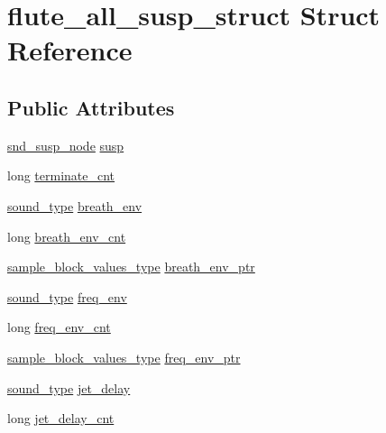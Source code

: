 \hypertarget{structflute__all__susp__struct}{}\section{flute\+\_\+all\+\_\+susp\+\_\+struct Struct Reference}
\label{structflute__all__susp__struct}
\subsection*{Public Attributes}
\begin{DoxyCompactItemize}
\item 
\hyperlink{sound_8h_a6b268203688a934bd798ceb55f85d4c0}{snd\+\_\+susp\+\_\+node} \hyperlink{structflute__all__susp__struct_afa541f45e24cb362f093246e91f13b1d}{susp}
\item 
long \hyperlink{structflute__all__susp__struct_a932b82614ea602dce0e45ea35ebba5e0}{terminate\+\_\+cnt}
\item 
\hyperlink{sound_8h_a792cec4ed9d6d636d342d9365ba265ea}{sound\+\_\+type} \hyperlink{structflute__all__susp__struct_afbe08c1b6541f6482034401882dbc6ee}{breath\+\_\+env}
\item 
long \hyperlink{structflute__all__susp__struct_a622286a136889a45a3f188decf524bf7}{breath\+\_\+env\+\_\+cnt}
\item 
\hyperlink{sound_8h_a83d17f7b465d1591f27cd28fc5eb8a03}{sample\+\_\+block\+\_\+values\+\_\+type} \hyperlink{structflute__all__susp__struct_ac46ce28b8ff7f1011bd99d666cf8fa37}{breath\+\_\+env\+\_\+ptr}
\item 
\hyperlink{sound_8h_a792cec4ed9d6d636d342d9365ba265ea}{sound\+\_\+type} \hyperlink{structflute__all__susp__struct_ad66dd4b1e5248a4feb91cfff31000f1b}{freq\+\_\+env}
\item 
long \hyperlink{structflute__all__susp__struct_aff71c1c9cf7f443da6bb3c6ee17ce0c4}{freq\+\_\+env\+\_\+cnt}
\item 
\hyperlink{sound_8h_a83d17f7b465d1591f27cd28fc5eb8a03}{sample\+\_\+block\+\_\+values\+\_\+type} \hyperlink{structflute__all__susp__struct_ac46e87153a2b41a82d50a7fb33a20cba}{freq\+\_\+env\+\_\+ptr}
\item 
\hyperlink{sound_8h_a792cec4ed9d6d636d342d9365ba265ea}{sound\+\_\+type} \hyperlink{structflute__all__susp__struct_ab1ba54af0fcdb71c915b7fa60d30fceb}{jet\+\_\+delay}
\item 
long \hyperlink{structflute__all__susp__struct_a05c90bbb9badc7f86bc38adbf0c5c97d}{jet\+\_\+delay\+\_\+cnt}
\item 

\end{DoxyCompactItemize}
